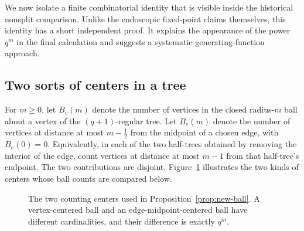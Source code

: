 \documentclass[12pt,letterpaper]{amsart}
\numberwithin{equation}{section}
\theoremstyle{definition}
\theoremstyle{plain}
\begin{document}
We now isolate a finite combinatorial identity that is visible inside
the historical nonsplit comparison. Unlike the endoscopic fixed-point
claims themselves, this identity has a short independent proof.
It explains the appearance of the power $q^m$ in the final
calculation and suggests a systematic generating-function approach.

\subsection{Two sorts of centers in a tree}
For $m\geq0$, let $B_v(m)$ denote the number of vertices in the
closed radius-$m$ ball about a vertex of the $(q+1)$-regular tree.
Let $B_e(m)$ denote the number of vertices at distance at most $m-\tfrac12$
from the midpoint of a chosen edge, with $B_e(0)=0$.
Equivalently, in each of the two half-trees obtained by removing
the interior of the edge, count vertices at distance at most
$m-1$ from that half-tree's endpoint. The two contributions
are disjoint. Figure~\ref{fig:new-tree-balls} illustrates the two kinds of centers whose ball counts are compared below.


\begin{figure}[htbp]
\centering
{}
\caption{The two counting centers used in Proposition~\ref{prop:new-ball}. A vertex-centered ball and an edge-midpoint-centered ball have different cardinalities, and their difference is exactly $q^m$.\label{fig:new-tree-balls}}
\end{figure}
\end{document}
